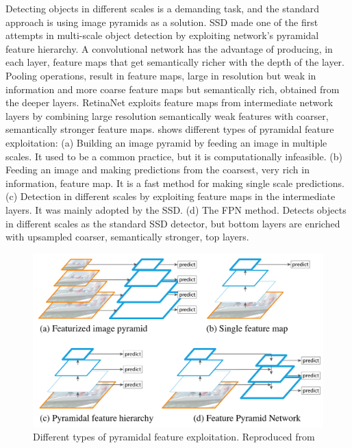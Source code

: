 Detecting objects in different scales is a demanding task, and the standard approach is using image pyramids as a solution. SSD made one of the first attempts in multi-scale object detection by exploiting network's pyramidal feature hierarchy. A convolutional network has the advantage of producing, in each layer, feature maps that get semantically richer with the depth of the layer. Pooling operations, result in feature maps, large in resolution but weak in information and more coarse feature maps but semantically rich, obtained from the deeper layers. RetinaNet exploits feature maps from intermediate network layers by combining large resolution semantically weak features with coarser, semantically stronger feature maps.  shows different types of pyramidal feature exploitation: (a) Building an image pyramid by feeding an image in multiple scales. It used to be a common practice, but it is computationally infeasible. (b) Feeding an image and making predictions from the coarsest, very rich in information, feature map. It is a fast method for making single scale predictions. (c) Detection in different scales by exploiting feature maps in the intermediate layers. It was mainly adopted by the SSD. (d) The FPN method. Detects objects in different scales as the standard SSD detector, but bottom layers are enriched with upsampled coarser, semantically stronger, top layers.

\begin{figure}[!htb]
  \centering
  \includegraphics[width=12cm]{figures/ch2/fig9.png}
  \caption{Different types of pyramidal feature exploitation. Reproduced from \cite{lin2017feature}}
  \label{fig9}
\end{figure} 

